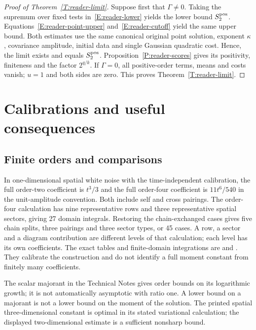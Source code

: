 \begin{proof}[Proof of Theorem~\ref{T:reader-limit}]
  Suppose first that $\Gamma \ne 0$. Taking the supremum over fixed tests
  in~\eqref{E:reader-lower} yields the lower bound $S^{\mathrm{pos}}_2$.
  Equations~\eqref{E:reader-point-upper} and~\eqref{E:reader-cutoff} yield the
  same upper bound. Both estimates use the same canonical original point
  solution, exponent $\kappa$, covariance amplitude, initial data and single
  Gaussian quadratic cost. Hence, the limit exists and equals $S^{\mathrm{pos}}_2$.
  Proposition~\ref{P:reader-scores} gives its positivity, finiteness and the
  factor $2^{q/k}$. If $\Gamma = 0$, all positive-order terms, means and costs
  vanish; $u = 1$ and both sides are zero. This proves
  Theorem~\ref{T:reader-limit}.
\end{proof}

\section{Calibrations and useful consequences}\label{S:reader-calibrations}
\subsection{Finite orders and comparisons}

In one-dimensional spatial white noise with the time-independent calibration,
the full order-two coefficient is $t^3/3$ and the full order-four coefficient is
$11t^6/540$ in the unit-amplitude convention. Both include self and cross
pairings. The order-four calculation has nine representative rows and three
representative spatial sectors, giving 27 domain integrals. Restoring the
chain-exchanged cases gives five chain splits, three pairings and three sector
types, or 45 cases. A row, a sector and a diagram contribution are different
levels of that calculation; each level has its own coefficients. The exact
tables and finite-domain integrations are  and
. They calibrate the construction and do not
identify a full moment constant from finitely many coefficients.

The scalar majorant in the Technical Notes gives order bounds on its logarithmic
growth; it is not automatically asymptotic with ratio one. A lower bound on a
majorant is not a lower bound on the moment of the solution. The printed spatial
three-dimensional constant is optimal in its stated variational calculation; the
displayed two-dimensional estimate is a sufficient nonsharp bound.

